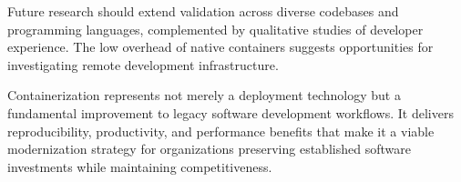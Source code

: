 Future research should extend validation across diverse codebases and programming languages, complemented by qualitative studies of developer experience.
The low overhead of native containers suggests opportunities for investigating remote development infrastructure.

Containerization represents not merely a deployment technology but a fundamental improvement to legacy software development workflows.
It delivers reproducibility, productivity, and performance benefits that make it a viable modernization strategy for organizations preserving established software investments while maintaining competitiveness.
